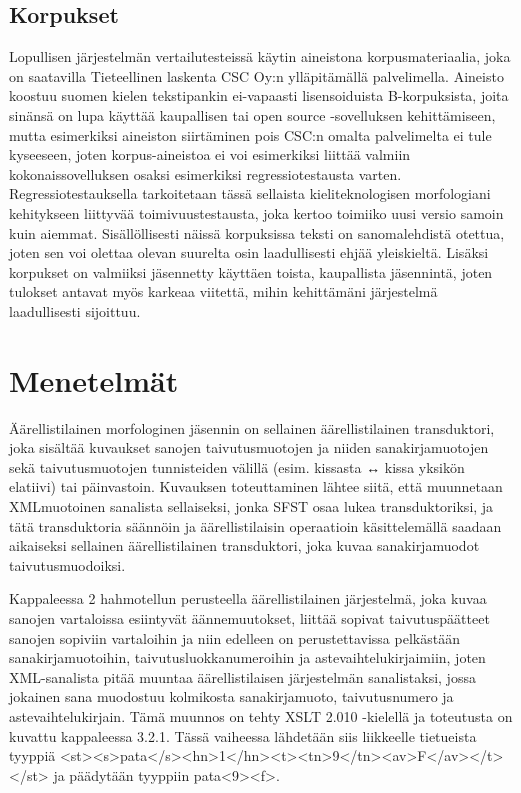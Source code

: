 \documentclass[free]{flammie}
\begin{document}
\subsection{Korpukset}

Lopullisen järjestelmän vertailutesteissä käytin aineistona korpusmateriaalia, joka
on saatavilla Tieteellinen laskenta CSC Oy:n ylläpitämällä palvelimella. Aineisto koostuu suomen kielen tekstipankin ei-vapaasti lisensoiduista B-korpuksista,
joita sinänsä on lupa käyttää kaupallisen tai open source -sovelluksen kehittämiseen, mutta esimerkiksi aineiston siirtäminen pois CSC:n omalta palvelimelta
ei tule kyseeseen, joten korpus-aineistoa ei voi esimerkiksi liittää valmiin kokonaissovelluksen osaksi esimerkiksi regressiotestausta varten. Regressiotestauksella tarkoitetaan tässä sellaista kieliteknologisen morfologiani kehitykseen liittyvää
toimivuustestausta, joka kertoo toimiiko uusi versio samoin kuin aiemmat.
Sisällöllisesti näissä korpuksissa teksti on sanomalehdistä otettua, joten sen voi
olettaa olevan suurelta osin laadullisesti ehjää yleiskieltä. Lisäksi korpukset on
valmiiksi jäsennetty käyttäen toista, kaupallista jäsennintä, joten tulokset antavat
myös karkeaa viitettä, mihin kehittämäni järjestelmä laadullisesti sijoittuu.

\section{Menetelmät}

Äärellistilainen morfologinen jäsennin on sellainen äärellistilainen transduktori,
joka sisältää kuvaukset sanojen taivutusmuotojen ja niiden sanakirjamuotojen sekä taivutusmuotojen tunnisteiden välillä (esim. kissasta ↔ kissa yksikön elatiivi) tai päinvastoin. Kuvauksen toteuttaminen lähtee siitä, että muunnetaan XMLmuotoinen sanalista sellaiseksi, jonka SFST osaa lukea transduktoriksi, ja tätä
transduktoria säännöin ja äärellistilaisin operaatioin käsittelemällä saadaan aikaiseksi sellainen äärellistilainen transduktori, joka kuvaa sanakirjamuodot taivutusmuodoiksi.

Kappaleessa 2 hahmotellun perusteella äärellistilainen järjestelmä, joka kuvaa
sanojen vartaloissa esiintyvät äännemuutokset, liittää sopivat taivutuspäätteet
sanojen sopiviin vartaloihin ja niin edelleen on perustettavissa pelkästään sanakirjamuotoihin, taivutusluokkanumeroihin ja astevaihtelukirjaimiin, joten
XML-sanalista pitää muuntaa äärellistilaisen järjestelmän sanalistaksi, jossa
jokainen sana muodostuu kolmikosta sanakirjamuoto, taivutusnumero ja astevaihtelukirjain. Tämä muunnos on tehty XSLT 2.010 -kielellä ja toteutusta on kuvattu kappaleessa 3.2.1. Tässä vaiheessa lähdetään siis liikkeelle tietueista tyyppiä
<st><s>pata</s><hn>1</hn><t><tn>9</tn><av>F</av></t></st>
ja päädytään tyyppiin pata<9><f>.
\end{document}
